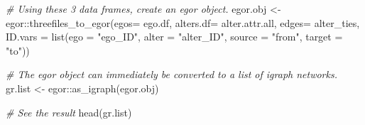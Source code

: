 \documentclass[
]{book}
\newenvironment{Shaded}{\begin{snugshade}}{\end{snugshade}}
\newcommand{\AttributeTok}[1]{\textcolor[rgb]{0.77,0.63,0.00}{#1}}
\newcommand{\CommentTok}[1]{\textcolor[rgb]{0.56,0.35,0.01}{\textit{#1}}}
\newcommand{\FunctionTok}[1]{\textcolor[rgb]{0.00,0.00,0.00}{#1}}
\newcommand{\NormalTok}[1]{#1}
\newcommand{\OtherTok}[1]{\textcolor[rgb]{0.56,0.35,0.01}{#1}}
\newcommand{\SpecialCharTok}[1]{\textcolor[rgb]{0.00,0.00,0.00}{#1}}
\newcommand{\StringTok}[1]{\textcolor[rgb]{0.31,0.60,0.02}{#1}}
\begin{document}
\begin{Shaded}
\begin{Highlighting}[]
\CommentTok{\# Using these 3 data frames, create an egor object.}
\NormalTok{egor.obj }\OtherTok{\textless{}{-}}\NormalTok{ egor}\SpecialCharTok{::}\FunctionTok{threefiles\_to\_egor}\NormalTok{(}\AttributeTok{egos=}\NormalTok{ ego.df, }
                               \AttributeTok{alters.df=}\NormalTok{ alter.attr.all, }
                               \AttributeTok{edges=}\NormalTok{ alter\_ties, }
                               \AttributeTok{ID.vars =} \FunctionTok{list}\NormalTok{(}\AttributeTok{ego =} \StringTok{"ego\_ID"}\NormalTok{, }
                                              \AttributeTok{alter =} \StringTok{"alter\_ID"}\NormalTok{, }
                                              \AttributeTok{source =} \StringTok{"from"}\NormalTok{, }
                                              \AttributeTok{target =} \StringTok{"to"}\NormalTok{))}

\CommentTok{\# The egor object can immediately be converted to a list of igraph networks.}
\NormalTok{gr.list }\OtherTok{\textless{}{-}}\NormalTok{ egor}\SpecialCharTok{::}\FunctionTok{as\_igraph}\NormalTok{(egor.obj)}

\CommentTok{\# See the result}
\FunctionTok{head}\NormalTok{(gr.list)}
\end{Highlighting}
\end{Shaded}
\end{document}
